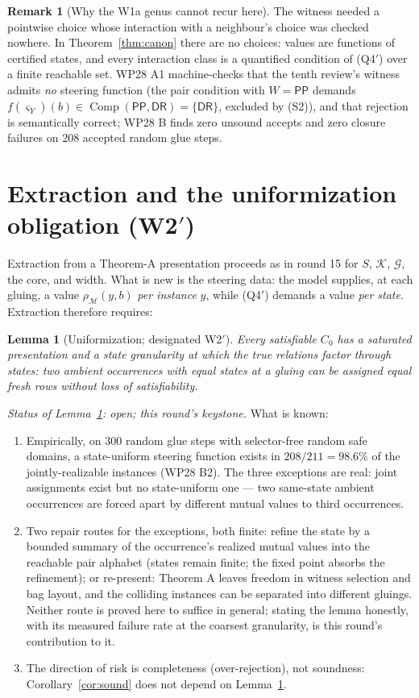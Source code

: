 \documentclass[11pt]{article}
\newtheorem{lemma}[theorem]{Lemma}
\theoremstyle{definition}
\newtheorem{remark}[theorem]{Remark}
\newcommand{\PP}{\mathsf{PP}}
\newcommand{\DR}{\mathsf{DR}}
\newcommand{\Comp}{\operatorname{Comp}}
\begin{document}
\begin{remark}[Why the W1a genus cannot recur here]
The witness needed a pointwise choice whose interaction with a
neighbour's choice was checked nowhere.  In Theorem~\ref{thm:canon}
there are no choices: values are functions of certified states, and
every interaction class is a quantified condition of (Q4$'$) over a
finite reachable set.  WP28 A1 machine-checks that the tenth review's
witness admits \emph{no} steering function (the pair condition with
$W=\PP$ demands $f(\varsigma_Y)(b)\in\Comp(\PP,\DR)=\{\DR\}$, excluded
by (S2)), and that rejection is semantically correct; WP28 B finds
zero unsound accepts and zero closure failures on 208 accepted random
glue steps.
\end{remark}

\section{Extraction and the uniformization obligation (W2$'$)}
\label{sec:extract}

Extraction from a Theorem-A presentation proceeds as in round 15 for
$S$, $\mathcal K$, $\mathcal G$, the core, and width.  What is new is
the steering data: the model supplies, at each gluing, a value
$\rho_{\mathcal M}(y,b)$ \emph{per instance} $y$, while (Q4$'$) demands
a value \emph{per state}.  Extraction therefore requires:

\begin{lemma}[Uniformization; designated W2$'$]\label{lem:unif}
Every satisfiable $C_0$ has a saturated presentation and a state
granularity at which the true relations factor through states: two
ambient occurrences with equal states at a gluing can be assigned equal
fresh rows without loss of satisfiability.
\end{lemma}

\emph{Status of Lemma~\ref{lem:unif}: open; this round's keystone.}
What is known:
\begin{enumerate}[leftmargin=2em]
\item Empirically, on 300 random glue steps with selector-free random
safe domains, a state-uniform steering function exists in
$208/211=98.6\%$ of the jointly-realizable instances (WP28 B2).  The
three exceptions are real: joint assignments exist but no state-uniform
one --- two same-state ambient occurrences are forced apart by
different mutual values to third occurrences.
\item Two repair routes for the exceptions, both finite: refine the
state by a bounded summary of the occurrence's realized mutual values
into the reachable pair alphabet (states remain finite; the fixed point
absorbs the refinement); or re-present: Theorem A leaves freedom in
witness selection and bag layout, and the colliding instances can be
separated into different gluings.  Neither route is proved here to
suffice in general; stating the lemma honestly, with its measured
failure rate at the coarsest granularity, is this round's contribution
to it.
\item The direction of risk is completeness (over-rejection), not
soundness: Corollary~\ref{cor:sound} does not depend on
Lemma~\ref{lem:unif}.
\end{enumerate}
\end{document}
